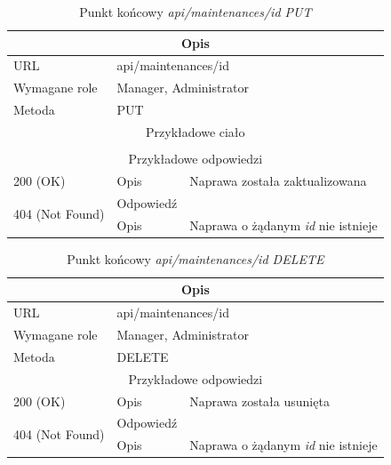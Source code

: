 \documentclass[eng,printmode,openany]{mgr}
\begin{document}
\begin{table}[H]
	\caption{Punkt końcowy \textit{api/maintenances/id PUT}}
	\begin{tabularx}{\textwidth}{|l|l|X|}
		\hline
		\multicolumn{3}{|c|}{Opis}                         						                \\ \hline
		URL                       & \multicolumn{2}{l|}{api/maintenances/id} 	                \\ \hline
		Wymagane role             & \multicolumn{2}{l|}{Manager, Administrator}                 \\ \hline	
		Metoda                    & \multicolumn{2}{l|}{PUT} 					                \\ \hline
		\multicolumn{3}{|c|}{Przykładowe ciało}         						                \\ \hline
		\multicolumn{3}{|c|}{} 	\\ \hline
		\multicolumn{3}{|c|}{Przykładowe odpowiedzi}                   		                    \\ \hline
		200 (OK)			& Opis         	& Naprawa została zaktualizowana									                    \\ \hline
		\multirow{2}{*}{404 (Not Found)} 	& Odpowiedź     &      \\ \cline{2-3} 
		& Opis          & Naprawa o żądanym \textit{id} nie istnieje  							                \\ \hline
	\end{tabularx}
\end{table}

\begin{table}[H]
	\caption{Punkt końcowy \textit{api/maintenances/id DELETE}}
	\begin{tabularx}{\textwidth}{|l|l|X|}
		\hline
		\multicolumn{3}{|c|}{Opis}                         						\\ \hline
		URL                       & \multicolumn{2}{l|}{api/maintenances/id} 	\\ \hline
		Wymagane role             & \multicolumn{2}{l|}{Manager, Administrator} \\ \hline
		Metoda                    & \multicolumn{2}{l|}{DELETE} 				\\ \hline
		\multicolumn{3}{|c|}{ Przykładowe odpowiedzi}                   		\\ \hline
		200 (OK)			& Opis         	& Naprawa została usunięta	        \\ \hline
		\multirow{2}{*}{404 (Not Found)} 	& Odpowiedź     &    \\ \cline{2-3} 
		& Opis          & Naprawa o żądanym \textit{id} nie istnieje  							         		 \\ \hline		
	\end{tabularx}
\end{table}
\end{document}
